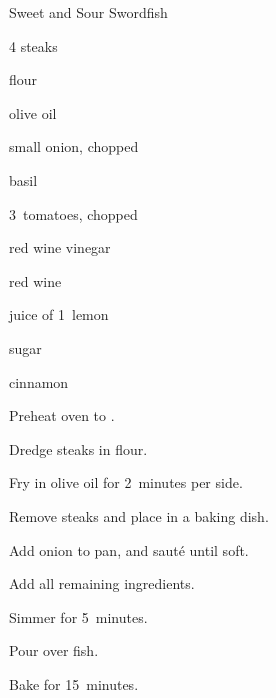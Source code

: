 \begin{recipe}{Sweet and Sour Swordfish}{}{}

\begin{ingredients}
\item 4   steaks
\item flour
\item {} olive oil
\item small onion, chopped
\item {} basil
\item 3~tomatoes, chopped
\item {} red wine vinegar
\item {} red wine
\item juice of 1~lemon
\item {} sugar
\item {} cinnamon
\end{ingredients}

\begin{directions}
\item Preheat oven to .
\item Dredge steaks in flour.
\item Fry in olive oil for 2~minutes per side.
\item Remove steaks and place in a baking dish.
\item Add onion to pan, and saut\'e until soft.
\item Add all remaining ingredients.
\item Simmer for 5~minutes.
\item Pour over fish.
\item Bake for 15~minutes.
\end{directions}

\end{recipe}
